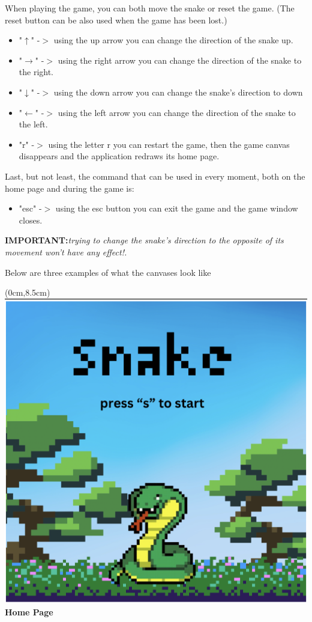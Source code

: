 \documentclass{article}
\begin{document}
	\noindent When playing the game, you can both move the snake or reset the game.  (The reset button can be also used when the game has been lost.)
	\begin{itemize}
		\item "$\uparrow$" -$>$ using the up arrow you can change the direction of the snake up.
		\item "$\rightarrow$" -$>$ using the right arrow you can change the direction of the snake to the right.
		\item "$\downarrow$" -$>$ using the down arrow you can change the snake's direction to down
		\item "$\leftarrow$" -$>$ using the left arrow you can change the direction of the snake to the left.
		\item "r" -$>$ using the letter r you can restart the game, then the game canvas disappears and the application redraws its home page.
	\end{itemize}
	
	\noindent Last, but not least, the command that can be used in every moment, both on the home page and during the game is:
	
	\begin{itemize}
		\item "esc" -$>$ using the esc button you can exit the game and the game window closes.
	\end{itemize}
	
	\noindent\textbf{\large{IMPORTANT:}}\emph{\large{trying to change the snake's direction to the opposite of its movement won't have any effect!.}}\\
	
	\centerline{Below are three examples of what the canvases look like}
	
	\begin{textblock*}{10cm}(0cm,8.5cm)
		\centering
		\includegraphics[width=.5\linewidth]{home.png}\\
		\Large{\textbf{Home Page}}
	\end{textblock*}
	
\end{document}

